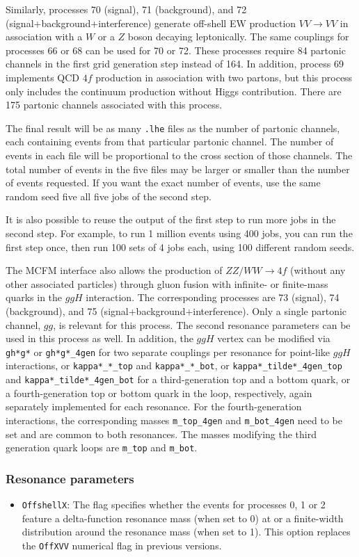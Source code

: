 \documentclass[aps,superscriptaddress,nofootinbib]{revtex4}
\begin{document}
Similarly, processes 70 (signal), 71 (background), and 72 (signal+background+interference) generate off-shell EW production $VV\to VV$ in association with a $W$ or a $Z$ boson decaying leptonically. The same couplings for processes 66 or 68 can be used for 70 or 72. These processes require 84 partonic channels in the first grid generation step instead of 164. In addition, process 69 implements QCD $4f$ production in association with two partons, but this process only includes the continuum production without Higgs contribution. There are 175 partonic channels associated with this process.

The final result will be as many \texttt{.lhe} files as the number of partonic channels, each containing events from that particular partonic channel.  The number of events in each file will be proportional to the cross section of those channels.  The total number of events in the five files may be larger or smaller than the number of events requested.  If you want the exact number of events, use the same random seed five all five jobs of the second step.

It is also possible to reuse the output of the first step to run more jobs in the second step.  For example, to run 1 million events using 400 jobs, you can run the first step once, then run 100 sets of 4 jobs each, using 100 different random seeds.

The MCFM interface also allows the production of $ZZ/WW\to4f$ (without any other associated particles) through gluon fusion with infinite- or finite-mass quarks in the $ggH$ interaction. The corresponding processes are 73 (signal), 74 (background), and 75 (signal+background+interference). Only a single partonic channel, $gg$, is relevant for this process. The second resonance parameters can be used in this process as well. In addition, the $ggH$ vertex can be modified via \verb|gh*g*| or \verb|gh*g*_4gen| for two separate couplings per resonance for point-like $ggH$ interactions, or \verb|kappa*_*_top| and \verb|kappa*_*_bot|, or \verb|kappa*_tilde*_4gen_top| and \verb|kappa*_tilde*_4gen_bot| for a third-generation top and a bottom quark, or a fourth-generation top or bottom quark in the loop, respectively, again separately implemented for each resonance. For the fourth-generation interactions, the corresponding masses \verb|m_top_4gen| and \verb|m_bot_4gen| need to be set and are common to both resonances. The masses modifying the third generation quark loops are \verb|m_top| and \verb|m_bot|.

\subsubsection{Resonance parameters}
\begin{itemize}
\item {\verb|OffshellX|}: The flag specifies whether the events for processes 0, 1 or 2 feature a delta-function resonance mass (when set to 0) at or a finite-width distribution around the resonance mass (when set to 1). This option replaces the \verb|OffXVV| numerical flag in previous versions.
\end{itemize}
\end{document}
